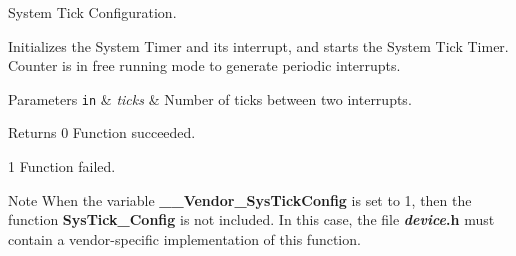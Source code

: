 System Tick Configuration. 

Initializes the System Timer and its interrupt, and starts the System Tick Timer. Counter is in free running mode to generate periodic interrupts. 
\begin{DoxyParams}[1]{Parameters}
\mbox{\tt in}  & {\em ticks} & Number of ticks between two interrupts. \\
\hline
\end{DoxyParams}
\begin{DoxyReturn}{Returns}
0 Function succeeded. 

1 Function failed. 
\end{DoxyReturn}
\begin{DoxyNote}{Note}
When the variable {\bfseries \-\_\-\-\_\-\-Vendor\-\_\-\-Sys\-Tick\-Config} is set to 1, then the function {\bfseries Sys\-Tick\-\_\-\-Config} is not included. In this case, the file {\bfseries {\itshape device}.h} must contain a vendor-\/specific implementation of this function. 
\end{DoxyNote}
